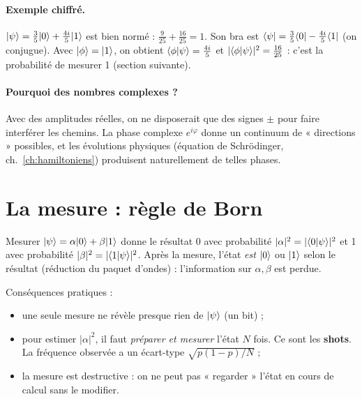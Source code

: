 \paragraph{Exemple chiffré.} $\lvert \psi\rangle=\tfrac35\lvert 0\rangle+\tfrac{4i}{5}\lvert 1\rangle$ est bien normé : $\tfrac9{25}+\tfrac{16}{25}=1$. Son bra est $\langle \psi\rvert=\tfrac35\langle 0\rvert-\tfrac{4i}{5}\langle 1\rvert$ (on conjugue). Avec $\lvert \phi\rangle=\lvert 1\rangle$, on obtient $\langle \phi\vert \psi\rangle=\tfrac{4i}5$ et $|\langle \phi\vert \psi\rangle|^2=\tfrac{16}{25}$ : c'est la probabilité de mesurer 1 (section suivante).

\paragraph{Pourquoi des nombres complexes ?} Avec des amplitudes réelles, on ne disposerait que des signes $\pm$ pour faire interférer les chemins. La phase complexe $e^{i\varphi}$ donne un continuum de « directions » possibles, et les évolutions physiques (équation de Schrödinger, ch.~\ref{ch:hamiltoniens}) produisent naturellement de telles phases.

\section{La mesure : règle de Born}
\begin{definition}
Mesurer $\lvert \psi\rangle=\alpha\lvert 0\rangle+\beta\lvert 1\rangle$ donne le résultat 0 avec probabilité $|\alpha|^2=|\langle 0\vert \psi\rangle|^2$ et 1 avec probabilité $|\beta|^2=|\langle 1\vert \psi\rangle|^2$. Après la mesure, l'état \emph{est} $\lvert 0\rangle$ ou $\lvert 1\rangle$ selon le résultat (réduction du paquet d'ondes) : l'information sur $\alpha,\beta$ est perdue.
\end{definition}
Conséquences pratiques :
\begin{itemize}
\item une seule mesure ne révèle presque rien de $\lvert \psi\rangle$ (un bit) ;
\item pour estimer $|\alpha|^2$, il faut \emph{préparer et mesurer} l'état $N$ fois. Ce sont les \textbf{shots}. La fréquence observée a un écart-type $\sqrt{p(1-p)/N}$ ;
\item la mesure est destructive : on ne peut pas « regarder » l'état en cours de calcul sans le modifier.
\end{itemize}

